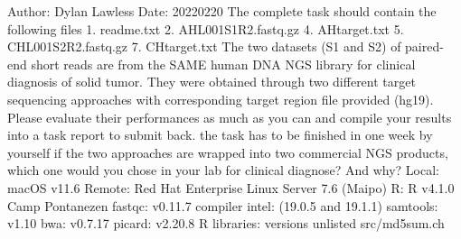 \markdownRendererInterblockSeparator
{}\markdownRendererInterblockSeparator
{}Author: Dylan Lawless Date: 20220220\markdownRendererInterblockSeparator
{}\markdownRendererInterblockSeparator
{}The complete task should contain the following files 1. readme.txt 2. AHL001S1R2.fastq.gz 4. AHtarget.txt 5. CHL001S2R2.fastq.gz 7. CHtarget.txt\markdownRendererInterblockSeparator
{}The two datasets (S1 and S2) of paired-end short reads are from the SAME human DNA NGS library for clinical diagnosis of solid tumor. They were obtained through two different target sequencing approaches with corresponding target region file provided (hg19). Please evaluate their performances as much as you can and compile your results into a task report to submit back.\markdownRendererInterblockSeparator
{}\markdownRendererOlBeginTight
{}the task has to be finished in one week by yourself\markdownRendererOlItemEnd 
{}if the two approaches are wrapped into two commercial NGS products, which one would you chose in your lab for clinical diagnose? And why?\markdownRendererOlItemEnd 
\markdownRendererOlEndTight \markdownRendererInterblockSeparator
{}\markdownRendererInterblockSeparator
{}\markdownRendererUlBeginTight
\markdownRendererUlItem Local: macOS v11.6\markdownRendererUlItemEnd 
\markdownRendererUlItem Remote: Red Hat Enterprise Linux Server 7.6 (Maipo)\markdownRendererUlItemEnd 
\markdownRendererUlItem R: R v4.1.0 Camp Pontanezen\markdownRendererUlItemEnd 
\markdownRendererUlItem fastqc: v0.11.7\markdownRendererUlItemEnd 
\markdownRendererUlItem compiler intel: (19.0.5 and 19.1.1)\markdownRendererUlItemEnd 
\markdownRendererUlItem samtools: v1.10\markdownRendererUlItemEnd 
\markdownRendererUlItem bwa: v0.7.17\markdownRendererUlItemEnd 
\markdownRendererUlItem picard: v2.20.8\markdownRendererUlItemEnd 
\markdownRendererUlItem R libraries: versions unlisted\markdownRendererUlItemEnd 
\markdownRendererUlEndTight \markdownRendererInterblockSeparator
{}\markdownRendererInterblockSeparator
{}\markdownRendererOlBeginTight
{}src/md5sum.ch\markdownRendererOlItemEnd 
